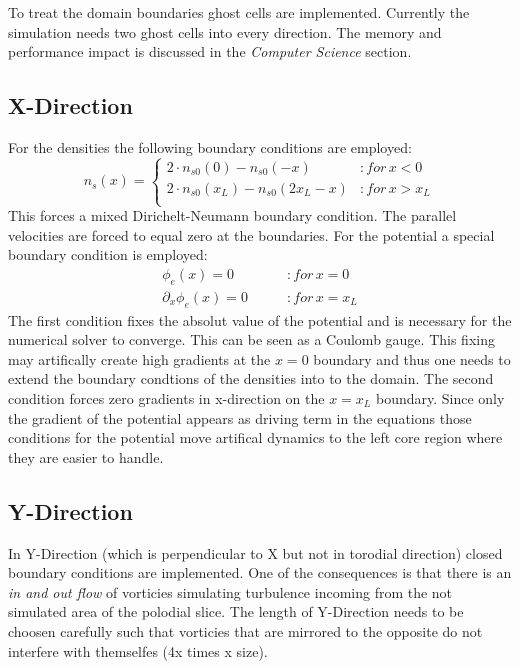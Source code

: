 \documentclass[master.tex]{subfiles}
\begin{document}
To treat the domain boundaries ghost cells are implemented. Currently the simulation needs two ghost cells into every direction. The memory and performance impact is discussed in the \textit{Computer Science} section.
\subsection{X-Direction}
For the densities the following boundary conditions are employed:
\begin{equation}
    n_s(x) = \begin{cases}
        2 \cdot n_{s0}(0) - n_{s0}(-x) &\colon for \, x < 0 \\
        2 \cdot n_{s0}(x_L) - n_{s0}(2x_L-x) &\colon for \, x > x_L \\
    \end{cases}
\end{equation}
This forces a mixed Dirichelt-Neumann boundary condition.
The parallel velocities are forced to equal zero at the boundaries.
For the potential a special boundary condition is employed:
\begin{align}
    \phi_e(x) = 0 \qquad &\colon for \, x = 0\\
    \partial_x\phi_e(x) = 0 \qquad &\colon for \, x = x_L \label{eq:boundary-potential-right}
\end{align}
The first condition fixes the absolut value of the potential and is necessary for the numerical solver to converge. This can be seen as a Coulomb gauge. This fixing may artifically create high gradients at the $x=0$ boundary and thus one needs to extend the boundary condtions of the densities into to the domain. The second condition forces zero gradients in x-direction on the $x=x_L$ boundary. Since only the gradient of the potential appears as driving term in the equations those conditions for the potential move artifical dynamics to the left core region where they are easier to handle. 

\subsection{Y-Direction}
In Y-Direction (which is perpendicular to X but not in torodial direction) closed boundary conditions are implemented. One of the consequences is that there is an \textit{in and out flow} of vorticies simulating turbulence incoming from the not simulated area of the polodial slice. The length of Y-Direction needs to be choosen carefully such that vorticies that are mirrored to the opposite do not interfere with themselfes (4x times x size).
\end{document}
